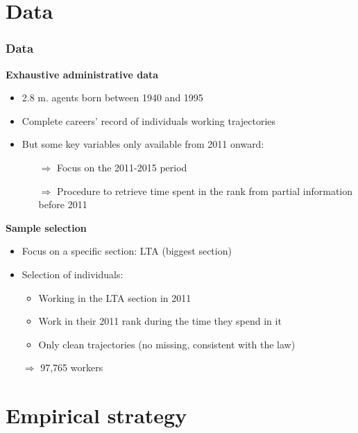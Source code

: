 \documentclass[xcolor=table,ignorenonframetext,12pt]{beamer}
\begin{document}
\section{Data}
\begin{frame}
\frametitle{Data}

\textbf{Exhaustive administrative data}
\begin{itemize}
	\item 2.8 m. agents born between 1940 and 1995
	\item Complete careers' record of individuals working trajectories
	\item But some key variables only available from 2011 onward:
	\begin{itemize}
		\item[$\Rightarrow$] Focus on the 2011-2015 period
		\item[$\Rightarrow$] Procedure to retrieve time spent in the rank from partial information before 2011
	\end{itemize}
\end{itemize}

\vspace{0.1cm}		
\textbf{Sample selection}		
\begin{itemize}
	\item Focus on a specific section: LTA (biggest section)
	\item Selection of individuals:
	\begin{itemize}
		\item Working in the LTA section in 2011 
		\item Work in their 2011 rank during the time they spend in it
		\item Only clean trajectories (no missing, consistent with the law) 	
	\end{itemize}
	\item[$\Rightarrow$] 97,765 workers
\end{itemize}

\end{frame}






\section{Empirical strategy}
\end{document}
